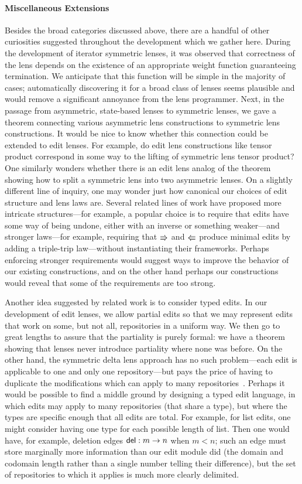 \paragraph*{Miscellaneous Extensions}
Besides the broad categories discussed above, there are a handful of other
curiosities suggested throughout the development which we gather here.
During the development of iterator symmetric lenses, it was observed that
correctness of the lens depends on the existence of an appropriate weight
function guaranteeing termination. We anticipate that this function will be
simple in the majority of cases; automatically discovering it for a broad
class of lenses seems plausible and would remove a significant annoyance
from the lens programmer. Next, in the passage from asymmetric, state-based
lenses to symmetric lenses, we gave a theorem connecting various asymmetric
lens constructions to symmetric lens constructions. It would be nice to know
whether this connection could be extended to edit lenses. For example, do
edit lens constructions like tensor product correspond in some way to the
lifting of symmetric lens tensor product? One similarly wonders whether
there is an edit lens analog of the theorem showing how to split a symmetric
lens into two asymmetric lenses. On a slightly different line of inquiry,
one may wonder just how canonical our choices of edit structure and lens
laws are. Several related lines of work have proposed more intricate
structures---for example, a popular choice is to require that edits have
some way of being undone, either with an inverse or something weaker---and
stronger laws---for example, requiring that $\mathord{\Rrightarrow}$ and $\mathord{\Lleftarrow}$ produce
minimal edits by adding a triple-trip law---without instantiating their
frameworks. Perhaps enforcing stronger requirements would suggest ways to
improve the behavior of our existing constructions, and on the other hand
perhaps our constructions would reveal that some of the requirements are too
strong.

Another idea suggested by related work is to consider typed edits. In our
development of edit lenses, we allow partial edits so that we may represent
edits that work on some, but not all, repositories in a uniform way. We then
go to great lengths to assure that the partiality is purely formal: we have
a theorem showing that lenses never introduce partiality where none was
before. On the other hand, the symmetric delta lens approach has no such
problem---each edit is applicable to one and only one repository---but pays
the price of having to duplicate the modifications which can apply to many
repositories~\cite{Diskin-Delta11}. Perhaps it would be possible to find a
middle ground by designing a typed edit language, in which edits may apply
to many repositories (that share a type), but where the types are specific
enough that all edits are total. For example, for list edits, one might
consider having one type for each possible length of list. Then one would
have, for example, deletion edges $\mathsf{del} : m \to n$ when $m<n$; such
an edge must store marginally more information than our edit module did (the
domain and codomain length rather than a single number telling their
difference), but the set of repositories to which it applies is much more
clearly delimited.

